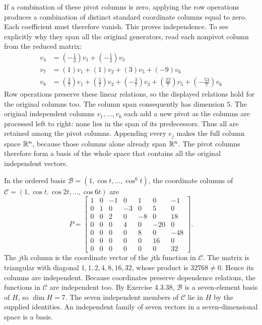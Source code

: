 If a combination of these pivot columns is zero, applying the row operations produces a combination of distinct standard coordinate columns equal to zero. Each coefficient must therefore vanish. This proves independence. To see explicitly why they span all the original generators, read each nonpivot column from the reduced matrix:
\[\begin{aligned}v_{4}&=(- \frac{1}{3})v_{1}+(- \frac{1}{3})v_{3}\\v_{7}&=(1)v_{1}+(1)v_{2}+(3)v_{5}+(-9)v_{6}\\v_{8}&=(\frac{3}{7})v_{1}+(\frac{5}{7})v_{2}+(- \frac{3}{7})v_{3}+(\frac{22}{7})v_{5}+(- \frac{53}{7})v_{6}\end{aligned}\]
Row operations preserve these linear relations, so the displayed relations hold for the original columns too. The column span consequently has dimension $5$.
The original independent columns $v_1,\ldots,v_k$ each add a new pivot as the columns are processed left to right: none lies in the span of its predecessors. Thus all are retained among the pivot columns. Appending every $e_j$ makes the full column space $\mathbb{R}^n$, because those columns alone already span $\mathbb{R}^n$. The pivot columns therefore form a basis of the whole space that contains all the original independent vectors.

In the ordered basis $\mathcal B=(1,\cos t,\ldots,\cos^6t)$, the coordinate columns of $\mathcal C=(1,\cos t,\cos2t,\ldots,\cos6t)$ are
\[P=\left[\begin{array}{rrrrrrr}1&0&-1&0&1&0&-1\\0&1&0&-3&0&5&0\\0&0&2&0&-8&0&18\\0&0&0&4&0&-20&0\\0&0&0&0&8&0&-48\\0&0&0&0&0&16&0\\0&0&0&0&0&0&32\end{array}\right].\]
The $j$th column is the coordinate vector of the $j$th function in $\mathcal C$. The matrix is triangular with diagonal $1,1,2,4,8,16,32$, whose product is $32768\ne0$. Hence its columns are independent. Because coordinates preserve dependence relations, the functions in $\mathcal C$ are independent too.
By Exercise 4.3.38, $\mathcal B$ is a seven-element basis of $H$, so $\dim H=7$. The seven independent members of $\mathcal C$ lie in $H$ by the supplied identities. An independent family of seven vectors in a seven-dimensional space is a basis.
